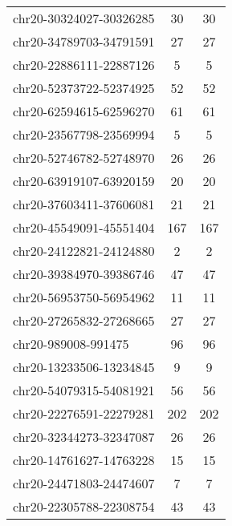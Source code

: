 \begin{longtable}{lSS}
	chr20-30324027-30326285 & 30     & 30                                        \\
	chr20-34789703-34791591 & 27     & 27                                        \\
	chr20-22886111-22887126 & 5      & 5                                         \\
	chr20-52373722-52374925 & 52     & 52                                        \\
	chr20-62594615-62596270 & 61     & 61                                        \\
	chr20-23567798-23569994 & 5      & 5                                         \\
	chr20-52746782-52748970 & 26     & 26                                        \\
	chr20-63919107-63920159 & 20     & 20                                        \\
	chr20-37603411-37606081 & 21     & 21                                        \\
	chr20-45549091-45551404 & 167    & 167                                       \\
	chr20-24122821-24124880 & 2      & 2                                         \\
	chr20-39384970-39386746 & 47     & 47                                        \\
	chr20-56953750-56954962 & 11     & 11                                        \\
	chr20-27265832-27268665 & 27     & 27                                        \\
	chr20-989008-991475     & 96     & 96                                        \\
	chr20-13233506-13234845 & 9      & 9                                         \\
	chr20-54079315-54081921 & 56     & 56                                        \\
	chr20-22276591-22279281 & 202    & 202                                       \\
	chr20-32344273-32347087 & 26     & 26                                        \\
	chr20-14761627-14763228 & 15     & 15                                        \\
	chr20-24471803-24474607 & 7      & 7                                         \\
	chr20-22305788-22308754 & 43     & 43                                        \\

\end{longtable}
